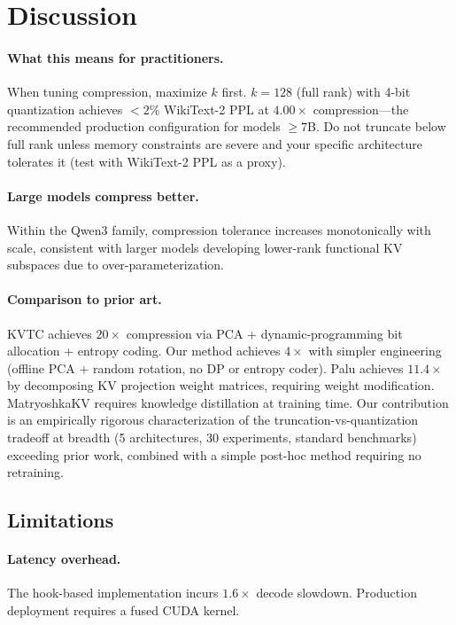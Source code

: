 \documentclass{article}
\begin{document}
\section{Discussion}
\label{sec:discussion}

\paragraph{What this means for practitioners.}
When tuning compression, maximize $k$ first. $k{=}128$ (full rank) with 4-bit
quantization achieves $<2\%$ WikiText-2 PPL at $4.00{\times}$ compression---the
recommended production configuration for models $\geq 7$B. Do not truncate below
full rank unless memory constraints are severe and your specific architecture
tolerates it (test with WikiText-2 PPL as a proxy).

\paragraph{Large models compress better.}
Within the Qwen3 family, compression tolerance increases monotonically with scale,
consistent with larger models developing lower-rank functional KV subspaces due to
over-parameterization.

\paragraph{Comparison to prior art.}
KVTC \cite{staniszewski2025kvtc} achieves $20{\times}$ compression via PCA +
dynamic-programming bit allocation + entropy coding. Our method achieves $4{\times}$
with simpler engineering (offline PCA + random rotation, no DP or entropy coder).
Palu \cite{chang2025palu} achieves $11.4{\times}$ by decomposing KV projection weight
matrices, requiring weight modification. MatryoshkaKV \cite{park2025matryoshka}
requires knowledge distillation at training time. Our contribution is an
empirically rigorous characterization of the truncation-vs-quantization tradeoff
at breadth (5 architectures, 30 experiments, standard benchmarks) exceeding prior
work, combined with a simple post-hoc method requiring no retraining.

\subsection{Limitations}
\label{sec:limitations}

\paragraph{Latency overhead.} The hook-based implementation incurs $1.6{\times}$
decode slowdown. Production deployment requires a fused CUDA kernel.
\end{document}

